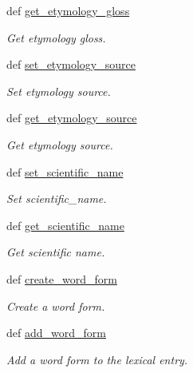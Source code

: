 \begin{DoxyCompactItemize}
def \hyperlink{classlmf_1_1src_1_1core_1_1lexical__entry_1_1_lexical_entry_a1756da5cb9ce0bab99cc900d3204be27}{get\+\_\+etymology\+\_\+gloss}
\begin{DoxyCompactList}\small\item\em Get etymology gloss. \end{DoxyCompactList}\item 
def \hyperlink{classlmf_1_1src_1_1core_1_1lexical__entry_1_1_lexical_entry_a82d85b914a1dd8f6ad6738b25c5ea172}{set\+\_\+etymology\+\_\+source}
\begin{DoxyCompactList}\small\item\em Set etymology source. \end{DoxyCompactList}\item 
def \hyperlink{classlmf_1_1src_1_1core_1_1lexical__entry_1_1_lexical_entry_a94b171c5e86e2fdeabb7bff1bc32de10}{get\+\_\+etymology\+\_\+source}
\begin{DoxyCompactList}\small\item\em Get etymology source. \end{DoxyCompactList}\item 
def \hyperlink{classlmf_1_1src_1_1core_1_1lexical__entry_1_1_lexical_entry_a819e2e7556f604962d5e299b747e55bb}{set\+\_\+scientific\+\_\+name}
\begin{DoxyCompactList}\small\item\em Set scientific\+\_\+name. \end{DoxyCompactList}\item 
def \hyperlink{classlmf_1_1src_1_1core_1_1lexical__entry_1_1_lexical_entry_a94c696b57970f35eabe92f2e454aafb5}{get\+\_\+scientific\+\_\+name}
\begin{DoxyCompactList}\small\item\em Get scientific name. \end{DoxyCompactList}\item 
def \hyperlink{classlmf_1_1src_1_1core_1_1lexical__entry_1_1_lexical_entry_afa9239b3df5d96fa1648e634e8ff471c}{create\+\_\+word\+\_\+form}
\begin{DoxyCompactList}\small\item\em Create a word form. \end{DoxyCompactList}\item 
def \hyperlink{classlmf_1_1src_1_1core_1_1lexical__entry_1_1_lexical_entry_a6d961cc5d3d155c2c93d4e991b766f04}{add\+\_\+word\+\_\+form}
\begin{DoxyCompactList}\small\item\em Add a word form to the lexical entry. \end{DoxyCompactList}\item 

\end{DoxyCompactItemize}
